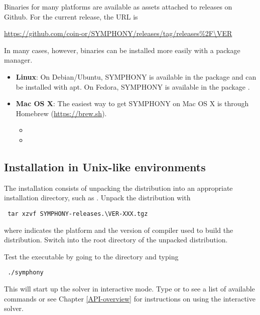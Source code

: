 Binaries for many platforms are available as assets attached to releases on
Github. For the current release, the URL is
\begin{center}
\url{https://github.com/coin-or/SYMPHONY/releases/tag/releases\%2F\VER}  
\end{center}
In many cases, however, binaries can be installed more easily with a package
manager. 
\begin{itemize}
\item \textbf{Linux}: On Debian/Ubuntu, SYMPHONY is available in the package  and can be installed with apt. On Fedora, SYMPHONY is available in the package .
\item \textbf{Mac OS X}: The easiest way to get SYMPHONY on Mac OS X is
  through Homebrew (\url{https://brew.sh}).
  \begin{itemize}
    \item {}
    \item {}
  \end{itemize}
\end{itemize}

\subsection{Installation in Unix-like environments}
\label{building-unix}

The installation consists of unpacking the distribution into an appropriate
installation directory, such as .
Unpack the distribution with
{\color{brown}
\begin{verbatim}
 tar xzvf SYMPHONY-releases.\VER-XXX.tgz
\end{verbatim}
}
where  indicates the platform and the version of compiler used to
build the distribution. Switch into the root directory of the unpacked
distribution. 

Test the executable by going to the  directory and typing 
{\color{brown}
\begin{verbatim}
 ./symphony
\end{verbatim}
}
This will start up the solver in interactive mode. Type 
or  to see a list of available commands or see Chapter
\ref{API-overview} for instructions on using the interactive solver.

